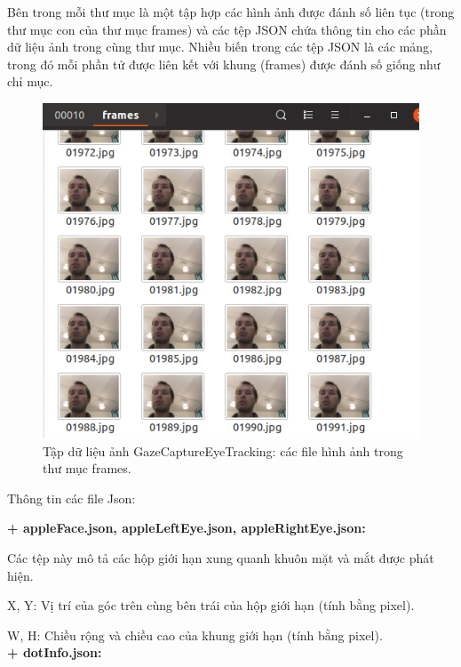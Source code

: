 \begin{itemize}
Bên trong mỗi thư mục là một tập hợp các hình ảnh được đánh số liên tục (trong thư mục con của thư mục frames) và các tệp JSON chứa thông tin cho các phần dữ liệu ảnh trong cùng thư mục. Nhiều biến trong các tệp JSON là các mảng, trong đó mỗi phần tử được liên kết với khung (frames) được đánh số giống như chỉ mục.
 \begin{center}
    \begin{figure}[h!]
    \begin{center}
     \includegraphics[scale=0.6]{img/GazeCaptureEyeTracking_anh.png}
    \end{center}
    \caption{Tập dữ liệu ảnh GazeCaptureEyeTracking: các file hình ảnh trong thư mục frames.}
    \label{refhinh20}
    \end{figure}
\end{center}

Thông tin các file Json:

 \textbf{+ appleFace.json, appleLeftEye.json, appleRightEye.json: }

Các tệp này mô tả các hộp giới hạn xung quanh khuôn mặt và mắt được phát hiện.  

X, Y: Vị trí của góc trên cùng bên trái của hộp giới hạn (tính bằng pixel).

W, H: Chiều rộng và chiều cao của khung giới hạn (tính bằng pixel).
\\

\textbf{+ dotInfo.json:}


\end{itemize}
